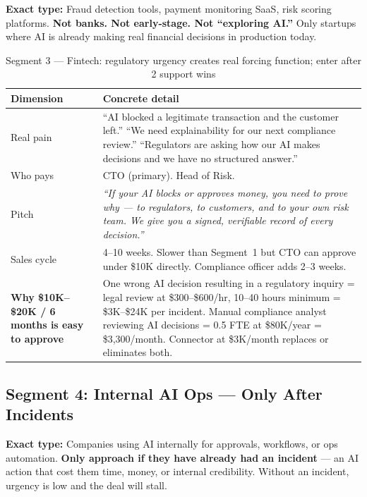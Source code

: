 \textbf{Exact type:} Fraud detection tools, payment monitoring SaaS, risk
scoring platforms. \textbf{Not banks. Not early-stage. Not ``exploring
AI.''} Only startups where AI is already making real financial decisions
in production today.

\begin{table}[H]
\centering\renewcommand{\arraystretch}{1.55}
\begin{tabularx}{\textwidth}{@{}lX@{}}
\toprule
\textbf{Dimension} & \textbf{Concrete detail} \\
\midrule
Real pain & ``AI blocked a legitimate transaction and the customer left.''
  ``We need explainability for our next compliance review.'' ``Regulators
  are asking how our AI makes decisions and we have no structured answer.'' \\
Who pays & CTO (primary). Head of Risk. \\
Pitch & \textit{``If your AI blocks or approves money, you need to prove
  why --- to regulators, to customers, and to your own risk team. We give
  you a signed, verifiable record of every decision.''} \\
Sales cycle & 4--10 weeks. Slower than Segment~1 but CTO can approve
  under \$10K directly. Compliance officer adds 2--3 weeks. \\
\midrule
\textbf{Why \$10K--\$20K / 6 months is easy to approve} &
  One wrong AI decision resulting in a regulatory inquiry = legal review
  at \$300--\$600/hr, 10--40 hours minimum = \$3K--\$24K per incident.
  Manual compliance analyst reviewing AI decisions = 0.5 FTE at \$80K/year
  = \$3,300/month. Connector at \$3K/month replaces or eliminates both. \\
\bottomrule
\end{tabularx}
\caption{Segment 3 --- Fintech: regulatory urgency creates real forcing function; enter after 2 support wins}
\end{table}

\subsection{Segment 4: Internal AI Ops \texorpdfstring{---}{-} Only After Incidents}

\textbf{Exact type:} Companies using AI internally for approvals, workflows,
or ops automation. \textbf{Only approach if they have already had an incident}
--- an AI action that cost them time, money, or internal credibility.
Without an incident, urgency is low and the deal will stall.

